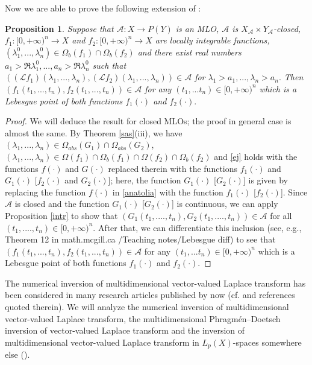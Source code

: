 \documentclass{amsart}
\newtheorem{prop}[thm]{Proposition}
\theoremstyle{definition}
\theoremstyle{remark}
\numberwithin{equation}{section}
\begin{document}
Now we are able to prove the following extension of \cite[Proposition 1.4.7]{FKP}:

\begin{prop}\label{piano-MLO}
Suppose that ${\mathcal A} : X\rightarrow P(Y)$ is an \emph{MLO}, ${\mathcal A}$ is $X_{\mathcal A} \times Y_{\mathcal A}$-closed,  
$f_{1}: [0,+\infty)^{n}\rightarrow X$ and $f_{2}: [0,+\infty)^{n}\rightarrow X$ are locally integrable functions, $(\lambda_{1}^{0},...,\lambda_{n}^{0})\in \Omega_{b}(f_{1}) \cap \Omega_{b}(f_{2})$ and there exist real numbers $a_{1}>\Re \lambda_{1}^{0},..., a_{n}>\Re \lambda_{n}^{0}$ such that $(( {\mathcal L} f_{1}) (\lambda_{1},...,\lambda_{n} ),( {\mathcal L} f_{2}) (\lambda_{1},...,\lambda_{n} ))\in {\mathcal A}$ for $\lambda_{1}>a_{1},...,\lambda_{n}>a_{n}.$
Then $(f_{1}(t_{1},...,t_{n}),f_{2}(t_{1},...,t_{n}))\in {\mathcal A}$ for any $(t_{1},...t_{n}) \in [0,+\infty)^{n}$ which is a Lebesgue point of both functions $f_{1}(\cdot)$ and $f_{2}(\cdot).$ 
\end{prop}

\begin{proof}
We will deduce the result for closed MLOs; the proof in general case is almost the same. By Theorem \ref{sas}(iii), we have $(\lambda_{1},...,\lambda_{n})\in \Omega_{abs}(G_{1}) \cap \Omega_{abs}(G_{2})$, $(\lambda_{1},...,\lambda_{n})\in \Omega (f_{1}) \cap \Omega_{b}(f_{1}) \cap \Omega (f_{2}) \cap \Omega_{b}(f_{2}) $ and \eqref{ej} holds with the functions $f(\cdot)$ and $G(\cdot)$ replaced therein with the functions $f_{1}(\cdot)$ and $G_{1}(\cdot)$ [$f_{2}(\cdot)$ and $G_{2}(\cdot)$]; here, the function $G_{1}(\cdot)$ [$G_{2}(\cdot)$] is given by replacing the function $f(\cdot)$ in \eqref{anatolia} with the function $f_{1}(\cdot)$ [$f_{2}(\cdot)$]. Since ${\mathcal A}$ is closed and the function $G_{1}(\cdot)$ [$G_{2}(\cdot)$] is continuous, we can apply Proposition \ref{intr} to show that $(G_{1}(t_{1},....,t_{n}), G_{2}(t_{1},....,t_{n}))\in {\mathcal A}$ for all $(t_{1},....,t_{n}) \in [0,+\infty)^{n}.$ After that, we can differentiate this inclusion (see, e.g., Theorem 12 in math.mcgill.ca /Teaching notes/Lebesgue diff) to see that $(f_{1}(t_{1},...,t_{n}),f_{2}(t_{1},...,t_{n}))\in {\mathcal A}$ for any $(t_{1},...t_{n}) \in [0,+\infty)^{n}$ which is a Lebesgue point of both functions $f_{1}(\cdot)$ and $f_{2}(\cdot).$ 
\end{proof}

The numerical inversion of multidimensional vector-valued Laplace transform has been considered in many research articles published by now (cf. \cite{abate,chakir,choud,moorthy,moorthy1,singal,wangzew} and references quoted therein).  We will analyze the numerical inversion of multidimensional vector-valued Laplace transform, the multidimensional Phragm\'en–Doetsch inversion of vector-valued Laplace transform and the inversion of  multidimensional vector-valued Laplace transform in $L_{p}(X)$-spaces somewhere else (\cite{weis}). 
\end{document}
